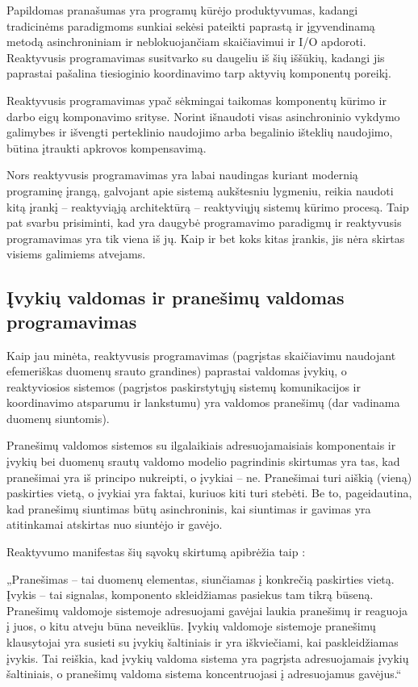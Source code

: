 Papildomas pranašumas yra programų kūrėjo produktyvumas, kadangi tradicinėms paradigmoms sunkiai sekėsi pateikti paprastą ir įgyvendinamą metodą asinchroniniam ir neblokuojančiam skaičiavimui ir I/O apdoroti. Reaktyvusis programavimas susitvarko su daugeliu iš šių iššūkių, kadangi jis paprastai pašalina tiesioginio koordinavimo tarp aktyvių komponentų poreikį.

Reaktyvusis programavimas ypač sėkmingai taikomas komponentų kūrimo ir darbo eigų komponavimo srityse. Norint išnaudoti visas asinchroninio vykdymo galimybes ir išvengti perteklinio naudojimo arba begalinio išteklių naudojimo, būtina įtraukti apkrovos kompensavimą.

Nors reaktyvusis programavimas yra labai naudingas kuriant modernią programinę įrangą, galvojant apie sistemą aukštesniu lygmeniu, reikia naudoti kitą įrankį – reaktyviąją architektūrą – reaktyviųjų sistemų kūrimo procesą. Taip pat svarbu prisiminti, kad yra daugybė programavimo paradigmų ir reaktyvusis programavimas yra tik viena iš jų. Kaip ir bet koks kitas įrankis, jis nėra skirtas visiems galimiems atvejams.

\subsection{Įvykių valdomas ir pranešimų valdomas programavimas}

Kaip jau minėta, reaktyvusis programavimas (pagrįstas skaičiavimu naudojant efemeriškas duomenų srauto grandines) paprastai valdomas įvykių, o reaktyviosios sistemos (pagrįstos paskirstytųjų sistemų komunikacijos ir koordinavimo atsparumu ir lankstumu) yra valdomos pranešimų (dar vadinama duomenų siuntomis).

Pranešimų valdomos sistemos su ilgalaikiais adresuojamaisiais komponentais ir įvykių bei duomenų srautų valdomo modelio pagrindinis skirtumas yra tas, kad pranešimai yra iš principo nukreipti, o įvykiai – ne. Pranešimai turi aiškią (vieną) paskirties vietą, o įvykiai yra faktai, kuriuos kiti turi stebėti. Be to, pageidautina, kad pranešimų siuntimas būtų asinchroninis, kai siuntimas ir gavimas yra atitinkamai atskirtas nuo siuntėjo ir gavėjo.

Reaktyvumo manifestas šių sąvokų skirtumą apibrėžia taip \cite{ReactiveManifesto}:

„Pranešimas – tai duomenų elementas, siunčiamas į konkrečią paskirties vietą. Įvykis – tai signalas, komponento skleidžiamas pasiekus tam tikrą būseną. Pranešimų valdomoje sistemoje adresuojami gavėjai laukia pranešimų ir reaguoja į juos, o kitu atveju būna neveiklūs. Įvykių valdomoje sistemoje pranešimų klausytojai yra susieti su įvykių šaltiniais ir yra iškviečiami, kai paskleidžiamas įvykis. Tai reiškia, kad įvykių valdoma sistema yra pagrįsta adresuojamais įvykių šaltiniais, o pranešimų valdoma sistema koncentruojasi į adresuojamus gavėjus.“

